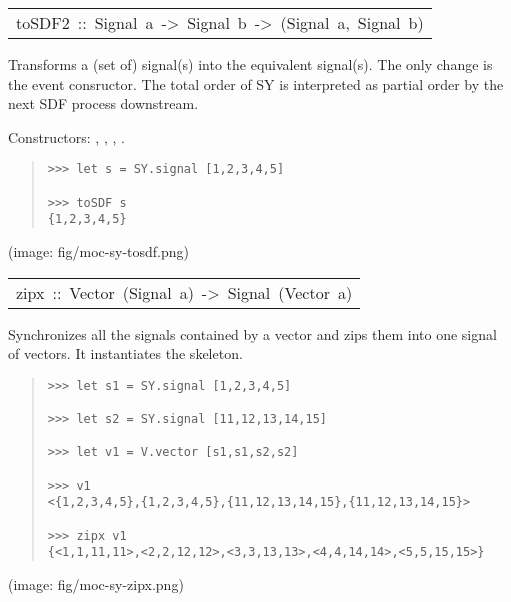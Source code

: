 \begin{haddockdesc}
\item[\begin{tabular}{@{}l}
toSDF2\ ::\ Signal\ a\ ->\ Signal\ b\ ->\ (Signal\ a,\ Signal\ b)
\end{tabular}]\haddockbegindoc
Transforms a (set of)  signal(s) into the
 equivalent  signal(s). The only change is
 the event consructor. The total order of SY is interpreted as
 partial order by the next SDF process downstream.\par
Constructors: , , , .\par
\begin{quote}
{\haddockverb\begin{verbatim}
>>> let s = SY.signal [1,2,3,4,5]

>>> toSDF s
{1,2,3,4,5}

\end{verbatim}}
\end{quote}(image: fig/moc-sy-tosdf.png)\par
           
\end{haddockdesc}
\begin{haddockdesc}
\item[\begin{tabular}{@{}l}
zipx\ ::\ Vector\ (Signal\ a)\ ->\ Signal\ (Vector\ a)
\end{tabular}]\haddockbegindoc
Synchronizes all the signals contained by a vector and zips them
 into one signal of vectors. It instantiates the
  skeleton.\par
\begin{quote}
{\haddockverb\begin{verbatim}
>>> let s1 = SY.signal [1,2,3,4,5]

>>> let s2 = SY.signal [11,12,13,14,15]

>>> let v1 = V.vector [s1,s1,s2,s2]

>>> v1
<{1,2,3,4,5},{1,2,3,4,5},{11,12,13,14,15},{11,12,13,14,15}>

>>> zipx v1
{<1,1,11,11>,<2,2,12,12>,<3,3,13,13>,<4,4,14,14>,<5,5,15,15>}

\end{verbatim}}
\end{quote}(image: fig/moc-sy-zipx.png)\par
           
\end{haddockdesc}
